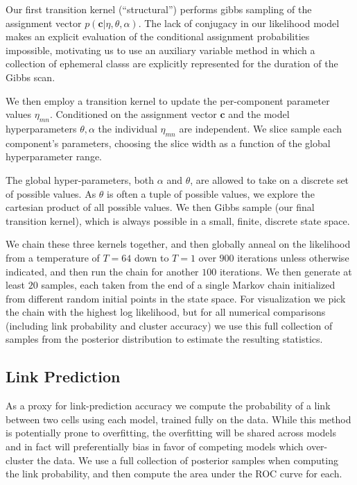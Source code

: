 \documentclass{article}
\renewcommand{\vec}[1]{\mathbf{#1}}
\begin{document}
Our first transition kernel (``structural'') performs gibbs sampling 
of the assignment vector $p(\vec{c} | \eta, \theta, \alpha)$. 
The lack of conjugacy in our likelihood model makes an explicit 
evaluation of the conditional assignment probabilities impossible, 
motivating us to use an auxiliary variable method \autocite{Neal2000}
in which a collection of ephemeral classs are explicitly represented
for the duration of the Gibbs scan. 

We then employ a transition kernel to update the per-component
parameter values $\eta_{mn}$. Conditioned on the assignment vector
$\vec{c}$ and the model hyperparameters $\theta, \alpha$ the 
individual $\eta_{mn}$ are independent. We slice sample \autocite{Neal2003}
each component's parameters, choosing the slice width as a function
of the global hyperparameter range. 

The global hyper-parameters, both $\alpha$ and $\theta$, are allowed
to take on a discrete set of possible values. As $\theta$ is often a
tuple of possible values, we explore the cartesian product of all
possible values. We then Gibbs sample (our final transition kernel),
which is always possible in a small, finite, discrete state space.

We chain these three kernels together, and then globally anneal on the
likelihood from a temperature of $T=64$ down to $T=1$ over $900$
iterations unless otherwise indicated, and then run the chain for
another $100$ iterations. We then generate at least $20$ samples, each
taken from the end of a single Markov chain initialized from different
random initial points in the state space. For visualization we pick the
chain with the highest log likelihood, but for all numerical
comparisons (including link probability and cluster accuracy) we use this full
collection of samples from the posterior distribution to estimate the
resulting statistics.

\subsection*{Link Prediction}
As a proxy for link-prediction accuracy we compute the probability of a link
between two cells using each model, trained fully on the data. While this method
is potentially prone to overfitting, the overfitting will be shared across models
and in fact will preferentially bias in favor of competing models
which over-cluster the data. We use a full collection of posterior samples when
computing the link probability, and then compute the area under the ROC curve for
each. 
\end{document}
